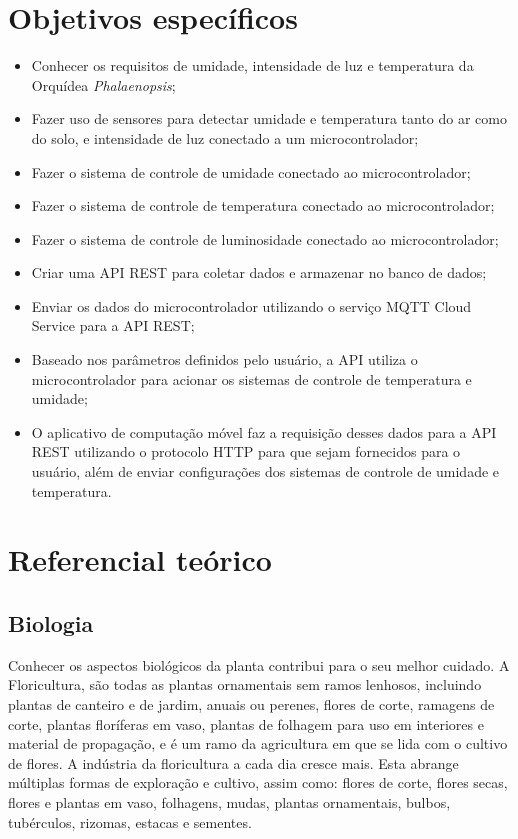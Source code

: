 \documentclass[conference]{IEEEtran}
\begin{document}
\section{Objetivos específicos}
\begin{itemize}
    \item Conhecer os requisitos de umidade, intensidade de luz e temperatura da Orquídea {\itshape{Phalaenopsis}};
    \item Fazer uso de sensores para detectar umidade e temperatura tanto do ar como do solo, e intensidade de luz conectado a um microcontrolador;
    \item Fazer o sistema de controle de umidade conectado ao microcontrolador;
    \item Fazer o sistema de controle de temperatura conectado ao microcontrolador;
    \item Fazer o sistema de controle de luminosidade conectado ao microcontrolador;
    \item Criar uma API REST para coletar dados e armazenar no banco de dados;
    \item Enviar os dados do microcontrolador utilizando o serviço MQTT Cloud Service para a API REST;
    \item Baseado nos parâmetros definidos pelo usuário, a API utiliza o microcontrolador para acionar os sistemas de controle de temperatura e umidade;
    \item O aplicativo de computação móvel faz a requisição desses dados para a API REST utilizando o protocolo HTTP para que sejam fornecidos para o usuário, além de enviar configurações dos sistemas de controle de umidade e temperatura.
\end{itemize}

\section{Referencial teórico}
\subsection{Biologia}
Conhecer os aspectos biológicos da planta contribui para o seu melhor cuidado. A Floricultura, são todas as plantas ornamentais sem ramos lenhosos, incluindo plantas de canteiro e de jardim, anuais ou perenes, flores de corte, ramagens de corte, plantas floríferas em vaso, plantas de folhagem para uso em interiores e material de propagação,\cite{b2} e é um ramo da agricultura em que se lida com o cultivo de flores. A indústria da floricultura a cada dia cresce mais.\cite{b1} Esta abrange múltiplas formas de exploração e cultivo, assim como: flores de corte, flores secas, flores e plantas em vaso, folhagens, mudas, plantas ornamentais, bulbos, tubérculos, rizomas, estacas e sementes.\cite{b2}
\end{document}
